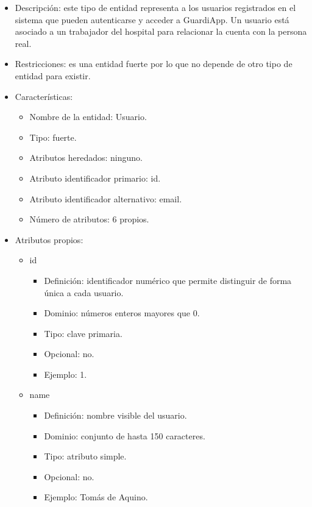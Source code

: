 \begin{itemize}
    \item Descripción: este tipo de entidad representa a los usuarios registrados en el sistema que pueden autenticarse y acceder a GuardiApp. Un usuario está asociado a un trabajador del hospital para relacionar la cuenta con la persona real.
    \item Restricciones: es una entidad fuerte por lo que no depende de otro tipo de entidad para existir.
    \item Características:
    \begin{itemize}
        \item Nombre de la entidad: Usuario.
        \item Tipo: fuerte.
        \item Atributos heredados: ninguno.
        \item Atributo identificador primario: id.
        \item Atributo identificador alternativo: email.
        \item Número de atributos: 6 propios.
    \end{itemize}

    \item Atributos propios:
    \begin{itemize}
        \item id
        \begin{itemize}
            \item Definición: identificador numérico que permite distinguir de forma única a cada usuario.
            \item Dominio: números enteros mayores que 0.
            \item Tipo: clave primaria.
            \item Opcional: no.
            \item Ejemplo: 1.
        \end{itemize}

        \item name
        \begin{itemize}
            \item Definición: nombre visible del usuario.
            \item Dominio: conjunto de hasta 150 caracteres.
            \item Tipo: atributo simple.
            \item Opcional: no.
            \item Ejemplo: Tomás de Aquino.
        \end{itemize}


\end{itemize}
\end{itemize}
